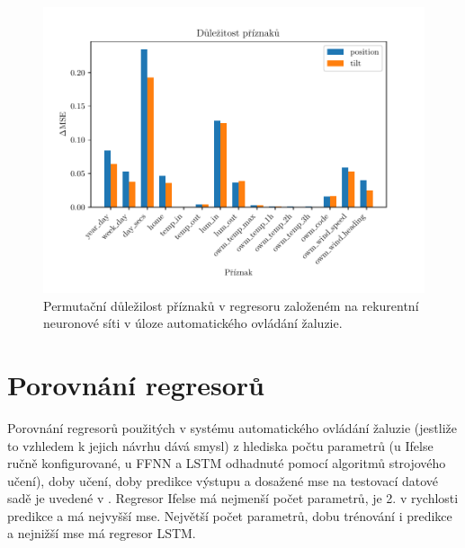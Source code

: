     \begin{figure}[H]
        \centering
        \includegraphics[draft=false,width=\textwidth]{img/results/pfi_lstm.pdf}
        \caption[Důležitost příznaků LSTM]{Permutační důležilost příznaků v regresoru založeném na rekurentní neuronové síti v úloze automatického ovládání žaluzie.}
        \label{fig:pfi_lstm}
    \end{figure}
\section{Porovnání regresorů} \label{sec:res_regr}
    Porovnání regresorů použitých v systému automatického ovládání žaluzie (jestliže to vzhledem k jejich návrhu dává smysl) z hlediska počtu parametrů (u Ifelse ručně konfigurované, u FFNN a LSTM odhadnuté pomocí algoritmů strojového učení), doby učení, doby predikce výstupu a dosažené \acrshort{mse} na testovací datové sadě je uvedené v . Regresor Ifelse má nejmenší počet parametrů, je 2. v rychlosti predikce a má nejvyšší \acrshort{mse}. Největší počet parametrů, dobu trénování i predikce a nejnižší \acrshort{mse} má regresor LSTM.
    

